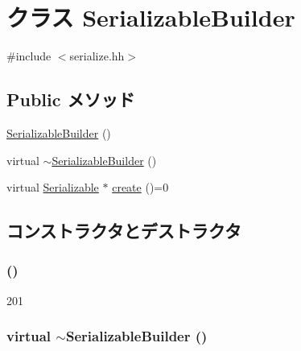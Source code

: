 \hypertarget{classSerializableBuilder}{
\section{クラス SerializableBuilder}
\label{classSerializableBuilder}
}


{\ttfamily \#include $<$serialize.hh$>$}\subsection*{Public メソッド}
\begin{DoxyCompactItemize}
\item 
\hyperlink{classSerializableBuilder_aee10c053006e1d25ab02033b00bc3d34}{SerializableBuilder} ()
\item 
virtual \hyperlink{classSerializableBuilder_adb422a6a4c8382b45d5f840d73c99e2e}{$\sim$SerializableBuilder} ()
\item 
virtual \hyperlink{classSerializable}{Serializable} $\ast$ \hyperlink{classSerializableBuilder_abd61bfbe39e50daf69ea1e812b49934d}{create} ()=0
\end{DoxyCompactItemize}


\subsection{コンストラクタとデストラクタ}
\hypertarget{classSerializableBuilder_aee10c053006e1d25ab02033b00bc3d34}{
\subsubsection[{SerializableBuilder}]{ ()}}
\label{classSerializableBuilder_aee10c053006e1d25ab02033b00bc3d34}



\begin{DoxyCode}
201 {}
\end{DoxyCode}
\hypertarget{classSerializableBuilder_adb422a6a4c8382b45d5f840d73c99e2e}{
\subsubsection[{$\sim$SerializableBuilder}]{\setlength{\rightskip}{0pt plus 5cm}virtual $\sim${\bf SerializableBuilder} ()}}
\label{classSerializableBuilder_adb422a6a4c8382b45d5f840d73c99e2e}



